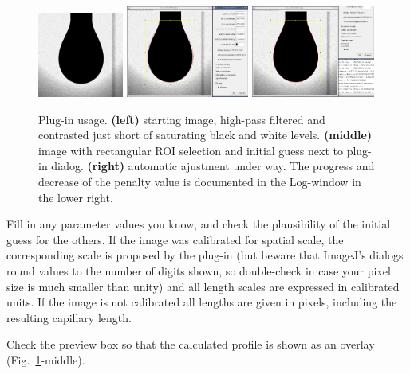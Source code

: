 \documentclass[fleqn]{scrartcl}
\begin{document}
\begin{figure}
  \centering
  \includegraphics[width=0.25\textwidth]{eauContrasteMax}\hfill
  \includegraphics[width=0.36\textwidth]{eauContrasteMaxInitial.png}\hfill
  \includegraphics[width=0.36\textwidth]{eauContrasteMaxFit2.png}
  \caption{Plug-in usage. \textbf{(left)} starting image, high-pass
    filtered and contrasted just short of saturating black and white
    levels. \textbf{(middle)} image with rectangular ROI selection and
    initial guess next to plug-in dialog. \textbf{(right)} automatic
    ajustment under way. The progress and decrease of the penalty
    value is documented in the Log-window in the lower right.}
  \label{fig:usage}
\end{figure}

Fill in any parameter values you know, and check the plausibility of
the initial guess for the others. If the image was calibrated for
spatial scale, the corresponding scale is proposed by the plug-in (but
beware that ImageJ's dialogs round values to the number of digits
shown, so double-check in case your pixel size is much smaller than
unity) and all length scales are expressed in calibrated units. If the
image is not calibrated all lengths are given in pixels, including the
resulting capillary length.

Check the preview box so that the calculated profile is shown as an
overlay (Fig.~\ref{fig:usage}-middle).
\end{document}
